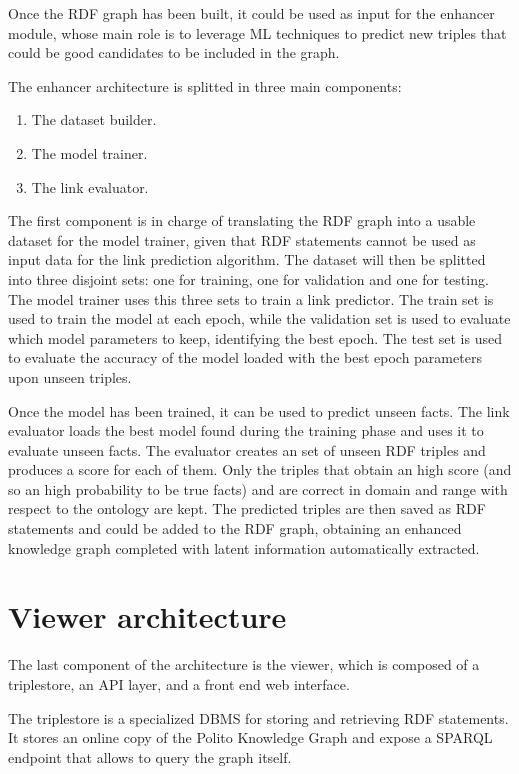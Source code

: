 \documentclass[%
    corpo=13.5pt,
    twoside,
    oldstyle,
    tipotesi=magistrale,
    greek,
    evenboxes
]{toptesi}
\begin{document}
Once the RDF graph has been built, it could be used as input for the enhancer
module, whose main role is to leverage ML techniques to predict new triples
that could be good candidates to be included in the graph.

The enhancer architecture is splitted in three main components:

\begin{enumerate}
    \item The dataset builder.
    \item The model trainer.
    \item The link evaluator.
\end{enumerate}

The first component is in charge of translating the RDF graph into a usable
dataset for the model trainer, given that RDF statements cannot be used as
input data for the link prediction algorithm.
The dataset will then be splitted into three disjoint sets: one for training,
one for validation and one for testing.
The model trainer uses this three sets to train a link predictor. The train
set is used to train the model at each epoch, while the validation set
is used to evaluate which model parameters to keep, identifying the best epoch.
The test set is used to evaluate the accuracy of the model loaded with the best
epoch parameters upon unseen triples.

Once the model has been trained, it can be used to predict unseen facts.
The link evaluator loads the best model found during the training phase and
uses it to evaluate unseen facts.
The evaluator creates an set of unseen RDF triples and produces a score for
each of them. Only the triples that obtain an high score (and so an high
probability to be true facts) and are correct in domain and range with respect
to the ontology are kept.
The predicted triples are then saved as RDF statements and could be added
to the RDF graph, obtaining an enhanced knowledge graph completed with
latent information automatically extracted.

\section{Viewer architecture}

The last component of the architecture is the viewer, which is composed of a
triplestore, an API layer, and a front end web interface.

The triplestore is a specialized DBMS for storing and retrieving RDF
statements.
It stores an online copy of the Polito Knowledge Graph and expose a
SPARQL endpoint that allows to query the graph itself.
\end{document}
